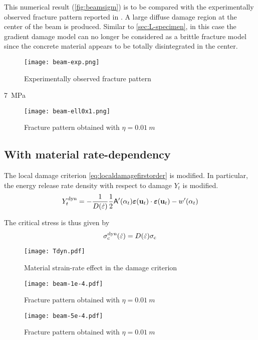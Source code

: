 This numerical result (\cref{fig:beamsigm}) is to be compared with the experimentally observed fracture pattern reported in \cite{Guilbaud:2015}. A large diffuse damage region at the center of the beam is produced. Similar to \cref{sec:L-specimen}, in this case the gradient damage model can no longer be considered as a brittle fracture model since the concrete material appears to be totally disintegrated in the center.
\begin{figure}[htbp]
\centering
\texttt{[image: beam-exp.png]}
\caption{Experimentally observed fracture pattern} \label{fig:beamexp}
\end{figure}

\SI{7}{MPa}
\begin{figure}[htbp]
\centering
\texttt{[image: beam-ell0x1.png]}
\caption{Fracture pattern obtained with $\eta=\SI{0.01}{m}$} \label{fig:beamell0x1}
\end{figure}

\subsection{With material rate-dependency}
The local damage criterion \eqref{eq:localdamagefirstorder} is modified. In particular, the energy release rate density with respect to damage $Y_t$ is modified.
\begin{equation} \label{eq:YtqtD}
Y_t^\mathrm{dyn}=-\frac{1}{D(\dot{\varepsilon})}\frac{1}{2}\tens{A}'(\alpha_t)\eps(\vec{u}_t)\cdot\eps(\vec{u}_t)-w'(\alpha_t)
\end{equation}

The critical stress is thus given by
\[
\sigma_{\mathrm{c}}^\mathrm{dyn}(\dot{\varepsilon})=D(\dot{\varepsilon})\sigma_{\mathrm{c}}
\]

\begin{figure}[htbp]
\centering
\texttt{[image: Tdyn.pdf]}
\caption{Material strain-rate effect in the damage criterion} \label{fig:tdyn}
\end{figure}


\begin{figure}[htbp]
\centering
\texttt{[image: beam-1e-4.pdf]}
\caption{Fracture pattern obtained with $\eta=\SI{0.01}{m}$} \label{fig:beamell0x11e-4}
\end{figure}

\begin{figure}[htbp]
\centering
\texttt{[image: beam-5e-4.pdf]}
\caption{Fracture pattern obtained with $\eta=\SI{0.01}{m}$} \label{fig:beamell0x15e-4}
\end{figure}

